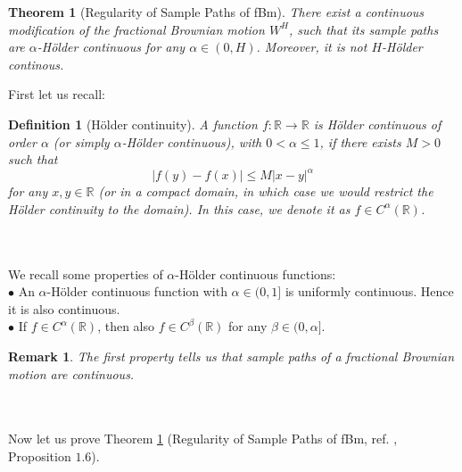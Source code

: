 \documentclass[a4paper,italian,11pt]{book}
\newtheorem{theorem}{Theorem}
\newtheorem{remark}{Remark}
\theoremstyle{plain}
\newtheorem{definition}{Definition}
\theoremstyle{remark}
\theoremstyle{plain}
\begin{document}
\begin{theorem}[Regularity of Sample Paths of fBm]
\label{theorem: regularityPaths}
There exist a continuous modification of the fractional Brownian motion $W^H$, such that its sample paths are $\alpha$-Hölder continuous for any $\alpha \in (0,H)$. Moreover, it is not $H$-Hölder continous.
\end{theorem}
\noindent
First let us recall:
\begin{definition}[Hölder continuity]
\label{def: holderContinuity}
A function $f:\mathbb{R}\to \mathbb{R}$ is Hölder continuous of order $\alpha$ (or simply $\alpha$-Hölder continuous), with $0<\alpha\le 1$, if there exists $M>0$ such that
\begin{equation}
    \label{eq: HölderProperty}
    |f(y)-f(x)|\le M|x-y|^\alpha 
\end{equation}
for any $x,y\in \mathbb{R}$ (or in a compact domain, in which case we would restrict the Hölder continuity to the domain). In this case, we denote it as $f\in C^\alpha(\mathbb{R})$.
\end{definition}
\\
\\
We recall some properties of $\alpha$-Hölder continuous functions: 
\\
$\bullet$ An $\alpha$-Hölder continuous function with $\alpha\in (0,1]$ is uniformly continuous. Hence it is also continuous.
\\
$\bullet$ If $f\in C^\alpha(\mathbb{R})$, then also $f\in C^\beta(\mathbb{R})$ for any $\beta \in (0,\alpha]$.
\\
\begin{remark}The first property tells us that sample paths of a fractional Brownian motion are continuous. 
\end{remark}
\\
\\
Now let us prove Theorem \ref{theorem: regularityPaths} (Regularity of Sample Paths of fBm, ref. \cite{NourdinIvan}, Proposition $1.6$).
\end{document}
